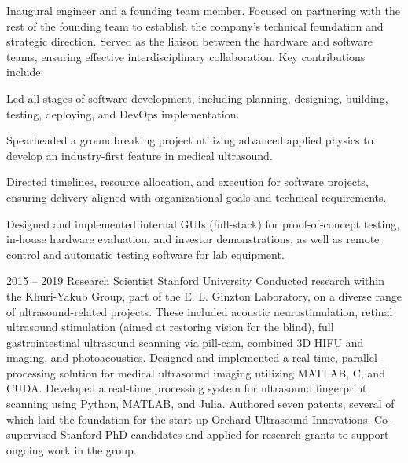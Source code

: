 \documentclass[8pt]{mofiicv}
\begin{document}
\begin{minipage}[T]{\SecondColumnWidth}
\begin{entrylist}
{			Inaugural engineer and a founding team member. Focused on partnering with the rest of the founding team to establish the company's technical foundation and strategic direction. Served as the liaison between the hardware and software teams, ensuring effective interdisciplinary collaboration. 
			Key contributions include:
			\begin{description}[noitemsep,font=\normalfont\itshape]
				\item[Software Development Leadership] Led all stages of software development, including planning, designing, building, testing, deploying, and DevOps implementation.
				\item[Nonlinear Signal Processing] Spearheaded a groundbreaking project utilizing advanced applied physics to develop an industry-first feature in medical ultrasound. 
				\item[Strategic Project Management]  Directed timelines, resource allocation, and execution for software projects, ensuring delivery aligned with organizational goals and technical requirements.
				\item[Innovative Software Solutions] Designed and implemented internal GUIs (full-stack) for proof-of-concept testing, in-house hardware evaluation, and investor demonstrations, as well as remote control and automatic testing software for lab equipment.
			\end{description}\vspace*{-0.9em}
			}
		\entry
			{2015 -- 2019}
			{Research Scientist}
			{Stanford University}
			{
			Conducted research within the Khuri-Yakub Group, part of the E. L. Ginzton Laboratory, on a diverse range of ultrasound-related projects. These included acoustic neurostimulation, retinal ultrasound stimulation (aimed at restoring vision for the blind), full gastrointestinal ultrasound scanning via pill-cam, combined 3D HIFU and imaging, and photoacoustics. Designed and implemented a real-time, parallel-processing solution for medical ultrasound imaging utilizing MATLAB, C, and CUDA. Developed a real-time processing system for ultrasound fingerprint scanning using Python, MATLAB, and Julia. Authored seven patents, several of which laid the foundation for the start-up Orchard Ultrasound Innovations. Co-supervised Stanford PhD candidates and applied for research grants to support ongoing work in the group.\\ 
			}
		\entry

\end{entrylist}
\end{minipage}
\end{document}
